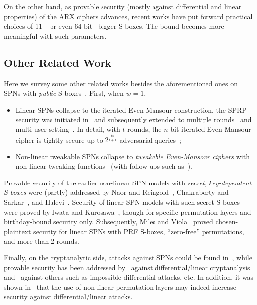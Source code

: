 On the other hand, as provable security (mostly against differential and linear properties) of the ARX ciphers advances, recent works have put forward practical choices of 11-~\cite{DBLP:journals/tosc/16-bit-Sbox} or even 64-bit~\cite{cryptoeprint:2019:1378} bigger S-boxes. The bound becomes more meaningful with such parameters.




\subsection{Other Related Work}


Here we survey some other related works besides the aforementioned ones on SPNs with {\it public} S-boxes~\cite{EC:DSSL16,EPRINT:DKSTZ17,EPRINT:CogLee18,C:CDKLST18}. First, when $w=1$,
%
\begin{itemize}
	\item Linear SPNs collapse to the iterated Even-Mansour construction, the SPRP security was initiated in~\cite{JC:EveMan97} and subsequently extended to multiple rounds~\cite{EC:BKLSST12,EPRINT:Steinberger12,AC:LamPatSeu12,EC:CheSte14,JC:CLLSS18,C:HoaTes16} and multi-user setting~\cite{C:HoaTes16}. In detail, with $t$ rounds, the $n$-bit iterated Even-Mansour cipher is tightly secure up to $2^{\frac{tn}{t+1}}$ adversarial queries~\cite{EC:BKLSST12,EC:CheSte14,C:HoaTes16};
	\item Non-linear tweakable SPNs collapse to {\it tweakable Even-Mansour ciphers} with non-linear tweaking functions~\cite{C:CogLamSeu15} (with follow-ups such as~\cite{AC:CogSeu15,EC:GJMN16,C:Mennink16}).
\end{itemize}
%
Provable security of the earlier non-linear SPN models with {\it secret, key-dependent S-boxes} were (partly) addressed by Naor and Reingold~\cite{JC:NaoRei99}, Chakraborty and Sarkar~\cite{FSE:ChaSar06}, and Halevi~\cite{C:Halevi07}. Security of linear SPN models with such secret S-boxes were proved by Iwata and Kurosawa~\cite{FSE:IwaKur00}, though for specific permutation layers and birthday-bound security only. Subsequently, Miles and Viola~\cite{miles2015substitution} proved chosen-plaintext security for linear SPNs with PRF S-boxes, ``zero-free'' permutations, and more than 2 rounds.


Finally, on the cryptanalytic side, attacks against SPNs could be found in~\cite{EC:Joux03,RSA:HalRog04,JC:BirSha10,AC:BirBouKho14,cryptoeprint:2015:646,cryptoeprint:2015:646}, while provable security has been addressed by~\cite{IMA:DaeRij01,AC:PSCYL02,FSE:PSLL03,miles2015substitution} against differential/linear cryptanalysis and~\cite{EC:SLGRL16} against others such as impossible differential attacks, etc. In addition, it was shown in~\cite{DBLP:journals/dcc/LiuRL18} that the use of non-linear permutation layers may indeed increase security against differential/linear attacks.



